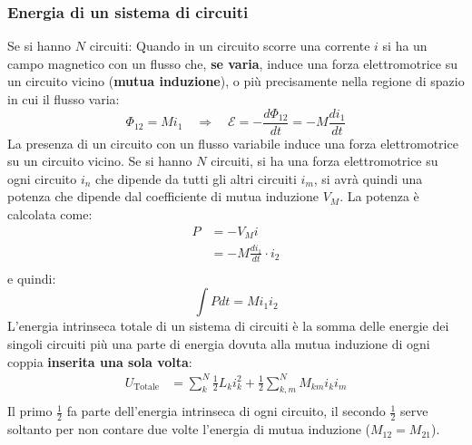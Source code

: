 \documentclass[a4paper]{article}
\begin{document}
\subsubsection{Energia di un sistema di circuiti}
Se si hanno \( N \) circuiti:
\label{04-06-D2}
Quando in un circuito scorre una corrente \( i \) si ha un campo magnetico con un flusso
che, \textbf{se varia}, induce una forza elettromotrice su un circuito vicino (\textbf{mutua induzione}),
o più precisamente nella regione di spazio in cui il flusso varia:
\[
  \Phi_{12} = M i_1 \quad \Rightarrow \quad \mathcal{E} = - \frac{d \Phi_{12}}{dt} = - M \frac{di_1}{dt}
\] 
La presenza di un circuito con un flusso variabile induce una forza elettromotrice
su un circuito vicino. Se si hanno \( N \) circuiti, si ha una forza elettromotrice
su ogni circuito \( i_n \) che dipende da tutti gli altri circuiti \( i_m \), si avrà
quindi una potenza che dipende dal coefficiente di mutua induzione \( V_M \). La potenza
è calcolata come:
\[
  \begin{aligned}
    P &= - V_M i\\
      &= -M \frac{di_1}{dt} \cdot i_2\\
  \end{aligned}
\] 
e quindi:
\[
  \int P dt = M i_1 i_2
\] 
L'energia intrinseca totale di un sistema di circuiti è la somma delle energie dei singoli
circuiti più una parte di energia dovuta alla mutua induzione di ogni coppia
\textbf{inserita una sola volta}:
\[
  \begin{aligned}
    U_{\text{Totale}} &= \sum_{k}^N \frac{1}{2} L_k i_k^2 
    + \frac{1}{2} \sum_{k,m}^N M_{km} i_k i_m\\
  \end{aligned}
\] 
Il primo $\frac{1}{2}$ fa parte dell'energia intrinseca di ogni circuito, il secondo
$\frac{1}{2}$ serve soltanto per non contare due volte
l'energia di mutua induzione (\( M_{12} = M_{21} \)).
\end{document}
